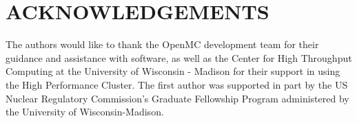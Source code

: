 \documentclass[letterpaper]{physor2024}
\begin{document}
\section*{ACKNOWLEDGEMENTS}
The authors would like to thank the OpenMC development team for their guidance and assistance with software, as well as the Center for High Throughput Computing at the University of Wisconsin - Madison for their support in using the High Performance Cluster. The first author was supported in part by the US Nuclear Regulatory Commission's Graduate Fellowship Program administered by the University of Wisconsin-Madison.




\end{document}
